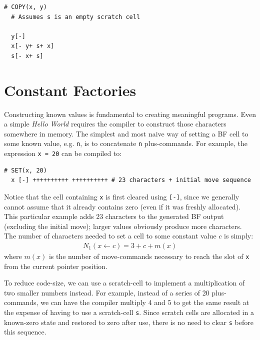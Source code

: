 \vspace{0.5cm}\noindent\begin{minipage}{\textwidth}
\begin{lstlisting}[style=brainfuck]
  # COPY(x, y)
  # Assumes s is an empty scratch cell
  
  y[-]
  x[- y+ s+ x]
  s[- x+ s]
\end{lstlisting}
\end{minipage}


\section{Constant Factories}
\label{sec:compilation:constants}
Constructing known values is fundamental to creating meaningful programs. Even a simple \emph{Hello World} requires the compiler to construct those characters somewhere in memory. The simplest and most naive way of setting a BF cell to some known value, e.g. \texttt{n}, is to concatenate \texttt{n} plus-commands. For example, the expression \texttt{x = 20} can be compiled to:
\begin{lstlisting}[style=brainfuck]
  # SET(x, 20)
  x [-] ++++++++++ ++++++++++ # 23 characters + initial move sequence
\end{lstlisting}
Notice that the cell containing \texttt{x} is first cleared using \texttt{[-]}, since we generally cannot assume that it already contains zero (even if it was freshly allocated). This particular example adds 23 characters to the generated BF output (excluding the initial move); larger values obviously produce more characters. The number of characters needed to set a cell to some constant value $c$ is simply:
\begin{align}
  N_1(x\leftarrow c) = 3 + c + m(x)
  \label{eq:n1}
\end{align}
where $m(x)$ is the number of move-commands necessary to reach the slot of \texttt{x} from the current pointer position.

To reduce code-size, we can use a scratch-cell to implement a multiplication of two smaller numbers instead. For example, instead of a series of 20 plus-commands, we can have the compiler multiply 4 and 5 to get the same result at the expense of having to use a scratch-cell \texttt{s}. Since scratch cells are allocated in a known-zero state and restored to zero after use, there is no need to clear \texttt{s} before this sequence.

